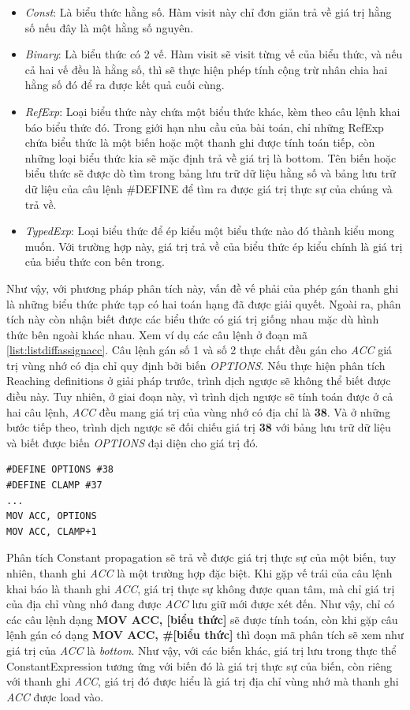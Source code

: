 \begin{itemize}
	\item \textit{Const}: Là biểu thức hằng số. Hàm visit này chỉ đơn giản trả về giá trị hằng số nếu đây là một hằng số nguyên.
	\item \textit{Binary}: Là biểu thức có 2 vế. Hàm visit sẽ visit từng vế của biểu thức, và nếu cả hai vế đều là hằng số, thì sẽ thực hiện phép tính cộng trừ nhân chia hai hằng số đó để ra được kết quả cuối cùng.
	\item \textit{RefExp}: Loại biểu thức này chứa một biểu thức khác, kèm theo câu lệnh khai báo biểu thức đó. Trong giới hạn nhu cầu của bài toán, chỉ những RefExp chứa biểu thức là một biến hoặc một thanh ghi được tính toán tiếp, còn những loại biểu thức kia sẽ mặc định trả về giá trị là bottom. Tên biến hoặc biểu thức sẽ được dò tìm trong bảng lưu trữ dữ liệu hằng số và bảng lưu trữ dữ liệu của câu lệnh \#DEFINE để tìm ra được giá trị thực sự của chúng và trả về.
	\item \textit{TypedExp}: Loại biểu thức để ép kiểu một biểu thức nào đó thành kiểu mong muốn. Với trường hợp này, giá trị trả về của biểu thức ép kiểu chính là giá trị của biểu thức con bên trong.
\end{itemize}


Như vậy, với phương pháp phân tích này, vấn đề vế phải của phép gán thanh ghi là những biểu thức phức tạp có hai toán hạng đã được giải quyết. Ngoài ra, phân tích này còn nhận biết được các biểu thức có giá trị giống nhau mặc dù hình thức bên ngoài khác nhau. Xem ví dụ các câu lệnh ở đoạn mã \ref{list:listdiffassignacc}. Câu lệnh gán số 1 và số 2 thực chất đều gán cho \textit{ACC} giá trị vùng nhớ có địa chỉ quy định bởi biến \textit{OPTIONS}. Nếu thực hiện phân tích Reaching definitions ở giải pháp trước, trình dịch ngược sẽ không thể biết được điều này. Tuy nhiên, ở giai đoạn này, vì trình dịch ngược sẽ tính toán được ở cả hai câu lệnh, \textit{ACC} đều mang giá trị của vùng nhớ có địa chỉ là \textbf{38}. Và ở những bước tiếp theo, trình dịch ngược sẽ đối chiếu giá trị \textbf{38} với bảng lưu trữ dữ liệu và biết được biến \textit{OPTIONS} đại diện cho giá trị đó.

\begin{lstlisting}[caption={Một số câu lệnh gán cho ACC có giá trị vế phải bằng nhau},label={list:listdiffassignacc}]
#DEFINE OPTIONS #38
#DEFINE CLAMP #37
...
MOV ACC, OPTIONS
MOV ACC, CLAMP+1
\end{lstlisting}

Phân tích Constant propagation sẽ trả về được giá trị thực sự của một biến, tuy nhiên, thanh ghi \textit{ACC} là một trường hợp đặc biệt. Khi gặp vế trái của câu lệnh khai báo là thanh ghi \textit{ACC}, giá trị thực sự không được quan tâm, mà chỉ giá trị của địa chỉ vùng nhớ đang được \textit{ACC} lưu giữ mới được xét đến. Như vậy, chỉ có các câu lệnh dạng \textbf{MOV ACC, [biểu thức]} sẽ được tính toán, còn khi gặp câu lệnh gán có dạng \textbf{MOV ACC, \#[biểu thức]} thì đoạn mã phân tích sẽ xem như giá trị của \textit{ACC} là \textit{bottom}. Như vậy, với các biến khác, giá trị lưu trong thực thể ConstantExpression tương ứng với biến đó là giá trị thực sự của biến, còn riêng với thanh ghi \textit{ACC}, giá trị đó được hiểu là giá trị địa chỉ vùng nhớ mà thanh ghi \textit{ACC} được load vào.
